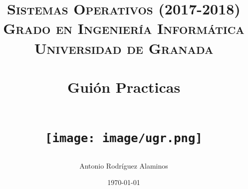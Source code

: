 


\title{	
\normalfont \normalsize 
\textsc{\textbf{Sistemas Operativos (2017-2018)} \\ Grado en Ingeniería Informática \\ Universidad de Granada} \\ [25pt] %
\horrule{0.5pt} \\[0.4cm] %
\huge Guión Practicas \\ %
\horrule{2pt} \\[0.5cm] %
\begin{figure}[H] %
	\centering
	\texttt{[image: image/ugr.png]}  %
\end{figure}
}

\author{Antonio Rodríguez Alaminos} %

\date{\normalsize\today} %





\maketitle %

\newpage %

\tableofcontents %



